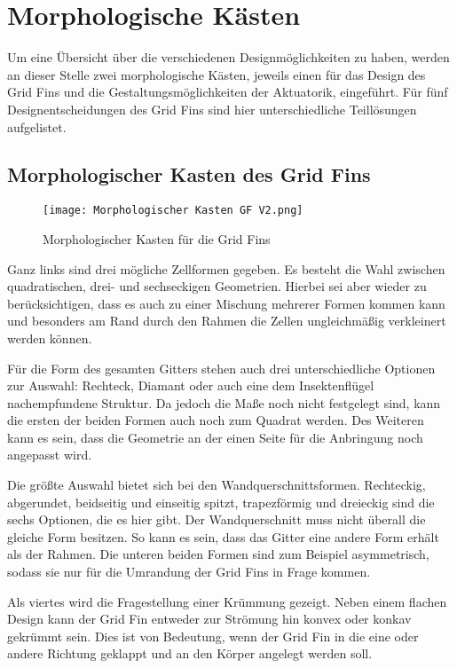 \section{Morphologische Kästen}
Um eine Übersicht über die verschiedenen Designmöglichkeiten zu haben, werden an dieser Stelle zwei morphologische Kästen, jeweils einen für das Design des Grid Fins und die Gestaltungsmöglichkeiten der Aktuatorik, eingeführt. Für fünf Designentscheidungen des Grid Fins sind hier unterschiedliche Teillösungen aufgelistet.
\subsection{Morphologischer Kasten des Grid Fins}
\begin{figure}[h]
	\centering
	\texttt{[image: Morphologischer Kasten GF V2.png]}
	\caption{Morphologischer Kasten für die Grid Fins}
	\label{abb_MorphKastGF}
\end{figure}
Ganz links sind drei mögliche Zellformen gegeben. Es besteht die Wahl zwischen quadratischen, drei- und sechseckigen Geometrien. Hierbei sei aber wieder zu berücksichtigen, dass es auch zu einer Mischung mehrerer Formen kommen kann und besonders am Rand durch den Rahmen die Zellen ungleichmäßig verkleinert werden können.

Für die Form des gesamten Gitters stehen auch drei unterschiedliche Optionen zur Auswahl: Rechteck, Diamant oder auch eine dem Insektenflügel nachempfundene Struktur. Da jedoch die Maße noch nicht festgelegt sind, kann die ersten der beiden Formen auch noch zum Quadrat werden. Des Weiteren kann es sein, dass die Geometrie an der einen Seite für die Anbringung noch angepasst wird.

Die größte Auswahl bietet sich bei den Wandquerschnittsformen. Rechteckig, abgerundet, beidseitig und einseitig spitzt, trapezförmig und dreieckig sind die sechs Optionen, die es hier gibt. Der Wandquerschnitt muss nicht überall die gleiche Form besitzen. So kann es sein, dass das Gitter eine andere Form erhält als der Rahmen. Die unteren beiden Formen sind zum Beispiel asymmetrisch, sodass sie nur für die Umrandung der Grid Fins in Frage kommen.

Als viertes wird die Fragestellung einer Krümmung gezeigt. Neben einem flachen Design kann der Grid Fin entweder zur Strömung hin konvex oder konkav gekrümmt sein. Dies ist von Bedeutung, wenn der Grid Fin in die eine oder andere Richtung geklappt und an den Körper angelegt werden soll.

